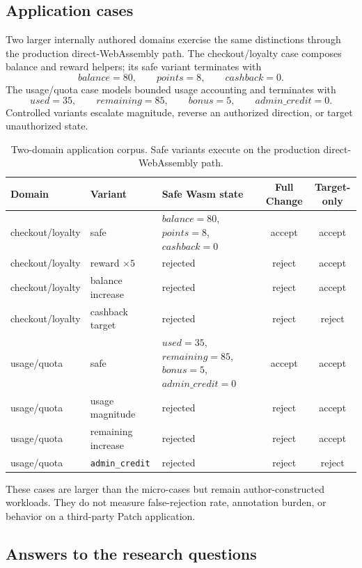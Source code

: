\documentclass[10pt]{article}
\theoremstyle{plain}
\theoremstyle{remark}
\begin{document}
\subsection{Application cases}
Two larger internally authored domains exercise the same distinctions through the production direct-WebAssembly path. The checkout/loyalty case composes balance and reward helpers; its safe variant terminates with
\[
balance=80,\qquad points=8,\qquad cashback=0.
\]
The usage/quota case models bounded usage accounting and terminates with
\[
used=35,\qquad remaining=85,\qquad bonus=5,\qquad admin\_credit=0.
\]
Controlled variants escalate magnitude, reverse an authorized direction, or target unauthorized state.

\begin{table}[t]
\centering
\caption{Two-domain application corpus. Safe variants execute on the production direct-WebAssembly path.}
\label{tab:application-corpus}
\small
\begin{tabular}{@{}p{28mm}p{29mm}p{55mm}cc@{}}
\toprule
Domain & Variant & Safe Wasm state & Full Change & Target-only \\
\midrule
checkout/loyalty & safe & $balance{=}80$, $points{=}8$, $cashback{=}0$ & accept & accept \\
checkout/loyalty & reward $\times 5$ & rejected & reject & accept \\
checkout/loyalty & balance increase & rejected & reject & accept \\
checkout/loyalty & cashback target & rejected & reject & reject \\
usage/quota & safe & $used{=}35$, $remaining{=}85$, $bonus{=}5$, $admin\_credit{=}0$ & accept & accept \\
usage/quota & usage magnitude & rejected & reject & accept \\
usage/quota & remaining increase & rejected & reject & accept \\
usage/quota & \texttt{admin\_credit} & rejected & reject & reject \\
\bottomrule
\end{tabular}
\end{table}

These cases are larger than the micro-cases but remain author-constructed workloads. They do not measure false-rejection rate, annotation burden, or behavior on a third-party Patch application.



\subsection{Answers to the research questions}
\end{document}
